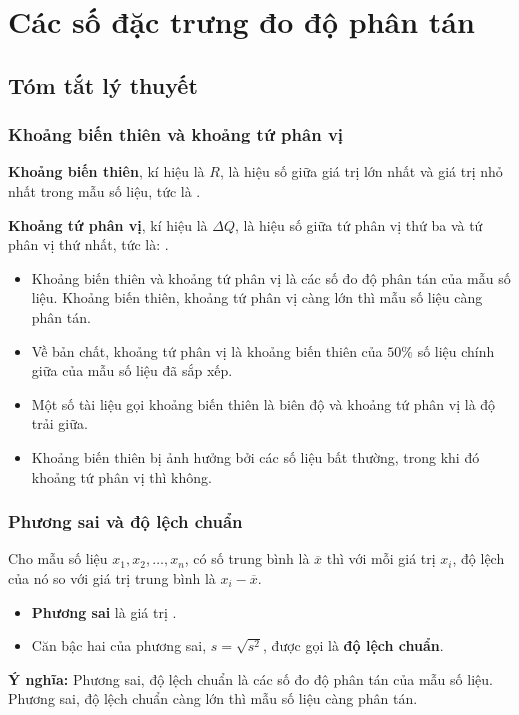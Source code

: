 \setcounter{dang}{0}
\section{Các số đặc trưng đo độ phân tán}
\subsection{Tóm tắt lý thuyết}
\subsubsection{Khoảng biến thiên và khoảng tứ phân vị}
\begin{boxdn}
	\textbf{Khoảng biến thiên}, kí hiệu là $R$, là hiệu số giữa giá trị lớn nhất và giá trị nhỏ nhất trong mẫu số liệu, tức là .
\end{boxdn}
\begin{boxdn}
	\textbf{Khoảng tứ phân vị}, kí hiệu là $ \Delta Q $, là hiệu số giữa tứ phân vị thứ ba và tứ phân vị thứ nhất, tức là: .
\end{boxdn}
\begin{itemize}
	\item Khoảng biến thiên và khoảng tứ phân vị là các số đo độ phân tán của mẫu số liệu. Khoảng biến thiên, khoảng tứ phân vị càng lớn thì mẫu số liệu càng phân tán.
	\item Về bản chất, khoảng tứ phân vị là khoảng biến thiên của $50 \%$ số liệu chính giữa của mẫu số liệu đã sắp xếp.
	\item Một số tài liệu gọi khoảng biến thiên là biên độ và khoảng tứ phân vị là độ trải giữa.
	\item Khoảng biến thiên bị ảnh hưởng bởi các số liệu bất thường, trong khi đó khoảng tứ phân vị thì không.
\end{itemize}
\subsubsection{Phương sai và độ lệch chuẩn}
\begin{boxdn}
	Cho mẫu số liệu $x_{1}, x_{2}, \ldots, x_{n}$, có số trung bình là $\overline{x}$ thì với mỗi giá trị $x_{i}$, độ lệch của nó so với giá trị trung bình là $x_{i}-\overline{x}$.
	\begin{itemize}
		\item \textbf{Phương sai} là giá trị .\\
		\item Căn bậc hai của phương sai, $s=\sqrt{s^{2}}$, được gọi là \textbf{độ lệch chuẩn}.
	\end{itemize}
\end{boxdn}
\textbf{Ý nghĩa:} Phương sai, độ lệch chuẩn là các số đo độ phân tán của mẫu số liệu. Phương sai, độ lệch chuẩn càng lớn thì mẫu số liệu càng phân tán.
